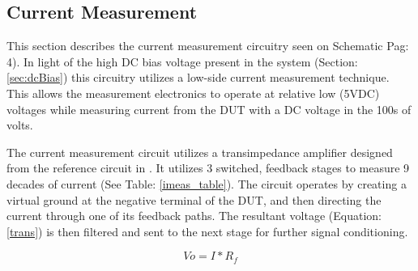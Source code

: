 \subsection{Current Measurement}

This section describes the current measurement circuitry seen on Schematic Pag: 4). In light of the high DC bias voltage present in the system (Section: \ref{sec:dcBias}) this circuitry utilizes a low-side current measurement technique. This allows the measurement electronics to operate at relative low (5VDC) voltages while measuring current from the DUT with a DC voltage in the 100s of volts.



The current measurement circuit utilizes a transimpedance amplifier designed from the reference circuit in \cite{steve_thesis}. It utilizes 3 switched, feedback stages to measure 9 decades of current (See Table: \ref{imeas_table}). The circuit operates by creating a virtual ground at the negative terminal of the DUT, and then directing the current through one of its feedback paths. The resultant voltage (Equation: \eqref{trans}) is then filtered and sent to the next stage for further signal conditioning.

\begin{equation}
\label{trans}
Vo = I*R_f
\end{equation}


